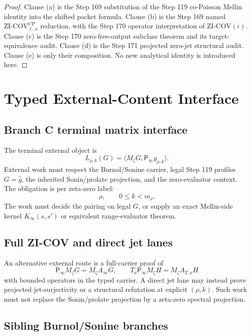 \documentclass[11pt]{article}
\newcommand{\Psym}{\mathsf P_\infty}
\newcommand{\Mz}{M_\zeta}
\begin{document}
\begin{proof}
Clause (a) is the Step 169 substitution of the Step 119 co-Poisson Mellin
identity into the shifted packet formula.  Clause (b) is the Step 169 named
\(\mathrm{ZI\mbox{-}COV}_{\ell,a}^{\mathrm{CP}}\) reduction, with the Step 170
operator interpretation of \(\mathrm{ZI\mbox{-}COV}(i)\).  Clause (c) is the
Step 170 zero-free-output subclass theorem and its target-equivalence audit.
Clause (d) is the Step 171 projected zero-jet structural audit.  Clause (e) is
only their composition.  No new analytical identity is introduced here.
\end{proof}

\section{Typed External-Content Interface}

\subsection*{Branch C terminal matrix interface}

The terminal external object is
\[
  L_{\rho,k}(G)=\langle \Mz G,\Psym y_{\rho,k}\rangle.
\]
External work must respect the Burnol/Sonine carrier, legal Step 119
profiles \(G=\widehat g\), the inherited Sonin/prolate projection, and the
zero-evaluator context.  The obligation is per zeta-zero label:
\[
  \rho,\qquad 0\le k<m_\rho.
\]
The work must decide the pairing on legal \(G\), or supply an exact
Mellin-side kernel \(K_\infty(s,s')\) or equivalent range-evaluator theorem.

\subsection*{Full ZI-COV and direct jet lanes}

An alternative external route is a full-carrier proof of
\[
  \Psym\Mz G=\Mz A_\infty G,
  \qquad
  T_a\Psym\Mz H=\Mz A_{T,a}H
\]
with bounded operators in the typed carrier.  A direct jet lane may instead
prove projected jet-surjectivity or a structural refutation at explicit
\((\rho,k)\).  Such work must not replace the Sonin/prolate projection by a
zeta-zero spectral projection.

\subsection*{Sibling Burnol/Sonine branches}
\end{document}
